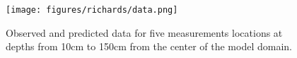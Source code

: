 \begin{figure}[ht]
\begin{center}
\texttt{[image: figures/richards/data.png]}
\end{center}
\caption{Observed and predicted data for five measurements locations at depths from 10cm to 150cm from the center of the model domain.}
\label{fig:richards-data}
\end{figure}
